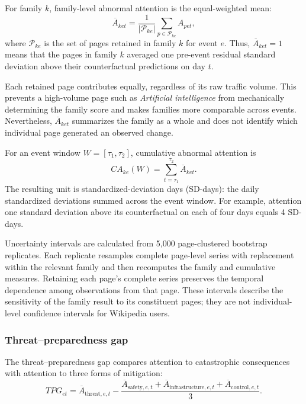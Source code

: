 \elsevierclasstrue\documentclass[preprint,12pt]{elsarticle}%
\begin{document}
For family $k$, family-level abnormal attention is the equal-weighted mean:
\begin{equation}
\overline{A}_{ket}
=
\frac{1}{\lvert\mathcal{P}_{ke}\rvert}
\sum_{p\in\mathcal{P}_{ke}} A_{pet},
\label{eq:familyattention}
\end{equation}
where \(\mathcal{P}_{ke}\) is the set of pages retained in family \(k\) for event \(e\). Thus, \(\overline{A}_{ket}=1\) means that the pages in family \(k\) averaged one pre-event residual standard deviation above their counterfactual predictions on day \(t\).

Each retained page contributes equally, regardless of its raw traffic volume. This prevents a high-volume page such as \emph{Artificial intelligence} from mechanically determining the family score and makes families more comparable across events. Nevertheless, $\overline{A}_{ket}$ summarizes the family as a whole and does not identify which individual page generated an observed change.

For an event window $W=[\tau_1,\tau_2]$, cumulative abnormal attention is
\begin{equation}
CA_{ke}(W)
=
\sum_{t=\tau_1}^{\tau_2}\overline{A}_{ket}.
\label{eq:cumulativeattention}
\end{equation}
The resulting unit is standardized-deviation days (SD-days): the daily standardized deviations summed across the event window. For example, attention one standard deviation above its counterfactual on each of four days equals 4 SD-days.

Uncertainty intervals are calculated from 5{,}000 page-clustered bootstrap replicates. Each replicate resamples complete page-level series with replacement within the relevant family and then recomputes the family and cumulative measures. Retaining each page's complete series preserves the temporal dependence among observations from that page. These intervals describe the sensitivity of the family result to its constituent pages; they are not individual-level confidence intervals for Wikipedia users.

\subsubsection{Threat--preparedness gap}

The threat--preparedness gap compares attention to catastrophic consequences
with attention to three forms of mitigation:
\begin{equation}
TPG_{et}
=
\overline{A}_{\mathrm{threat},e,t}
-
\frac{
\overline{A}_{\mathrm{safety},e,t}
+
\overline{A}_{\mathrm{infrastructure},e,t}
+
\overline{A}_{\mathrm{control},e,t}
}{3}.
\label{eq:tpg}
\end{equation}
\end{document}
